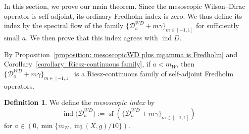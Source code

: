 \documentclass[a4paper,oneside,12pt]{amsart}
\theoremstyle{plain}
\theoremstyle{definition}
\newtheorem{definition}[theorem]{Definition}
\theoremstyle{remark}
\DeclareMathOperator{\indexAtiyahSinger}{ind}
\DeclareMathOperator{\spectralflow}{sf}
\DeclareMathOperator{\injectivityradius}{inj}
\newcommand{\mesoscopicWilsonDiracoperator}[1][a]{\mathcal{D}_{#1}^{\mathit{WD}}}
\begin{document}
In this section, we prove our main theorem.
Since the mesoscopic Wilson--Dirac operator is self-adjoint, its ordinary Fredholm index is zero.
We thus define its index by the spectral flow of the family $\{\mesoscopicWilsonDiracoperator + m\gamma\}_{m\in[-1,1]}$ for sufficiently small $a$.
We then prove that this index agrees with $\indexAtiyahSinger D$.

By Proposition~\ref{proposition: mesoscopicWD plus mgamma is Fredholm} and Corollary~\ref{corollary: Riesz-continuous family}, if $a < m_W$, then $\{\mesoscopicWilsonDiracoperator + m\gamma\}_{m \in [-1,1]}$ is a Riesz-continuous family of self-adjoint Fredholm operators.

\begin{definition}\label{definition: mesoscopic index}
  We define the \emph{mesoscopic index} by
  \begin{equation}
    \indexAtiyahSinger \bigl( \mesoscopicWilsonDiracoperator \bigr) := \spectralflow \left( \bigl\{ \mesoscopicWilsonDiracoperator + m\gamma \bigr\}_{m \in [-1,1]} \right)
  \end{equation}
  for $a \in (0,\min\{m_W, \injectivityradius(X,g)/10\})$.
\end{definition}
\end{document}

